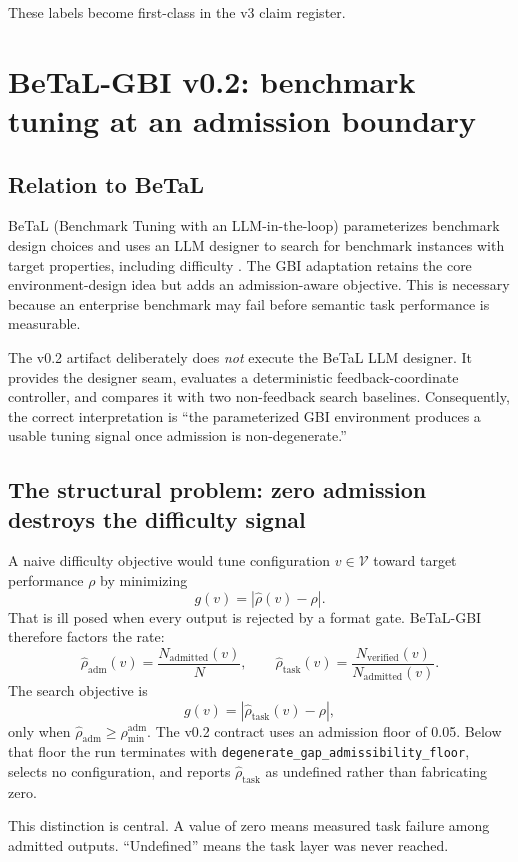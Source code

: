 \documentclass[11pt]{article}
\newcommand{\rhatadm}{\widehat{\rho}_{\mathrm{adm}}}
\newcommand{\rhattask}{\widehat{\rho}_{\mathrm{task}}}
\newcommand{\code}[1]{\texttt{#1}}
\begin{document}
These labels become first-class in the v3 claim register.

\section{BeTaL-GBI v0.2: benchmark tuning at an admission boundary}

\subsection{Relation to BeTaL}

BeTaL (Benchmark Tuning with an LLM-in-the-loop) parameterizes benchmark design choices and uses an LLM designer to search for benchmark instances with target properties, including difficulty \cite{dsouza2025betal}. The GBI adaptation retains the core environment-design idea but adds an admission-aware objective. This is necessary because an enterprise benchmark may fail before semantic task performance is measurable.

The v0.2 artifact deliberately does \emph{not} execute the BeTaL LLM designer. It provides the designer seam, evaluates a deterministic feedback-coordinate controller, and compares it with two non-feedback search baselines. Consequently, the correct interpretation is ``the parameterized GBI environment produces a usable tuning signal once admission is non-degenerate.''

\subsection{The structural problem: zero admission destroys the difficulty signal}

A naive difficulty objective would tune configuration \(v\in\mathcal V\) toward target performance \(\rho\) by minimizing
\[
g(v)=|\widehat{\rho}(v)-\rho|.
\]
That is ill posed when every output is rejected by a format gate. BeTaL-GBI therefore factors the rate:
\[
\rhatadm(v)=\frac{N_{\mathrm{admitted}}(v)}{N},
\qquad
\rhattask(v)=\frac{N_{\mathrm{verified}}(v)}{N_{\mathrm{admitted}}(v)}.
\]
The search objective is
\[
g(v)=|\rhattask(v)-\rho|,
\]
only when \(\rhatadm\ge\rho_{\min}^{\mathrm{adm}}\). The v0.2 contract uses an admission floor of 0.05. Below that floor the run terminates with \code{degenerate\_gap\_admissibility\_floor}, selects no configuration, and reports \(\rhattask\) as undefined rather than fabricating zero.

This distinction is central. A value of zero means measured task failure among admitted outputs. ``Undefined'' means the task layer was never reached.
\end{document}
